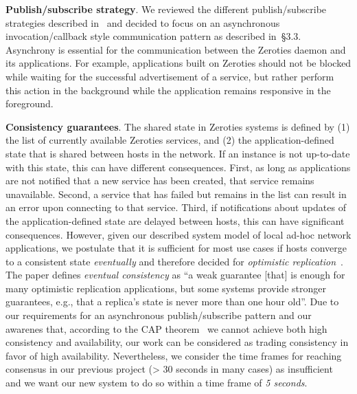 \textbf{Publish/subscribe strategy}. 
We reviewed the different publish/subscribe strategies described in~\cite{eugster_2003} and decided to focus on an asynchronous invocation/callback style communication pattern as described in~\cite{eugster_2003}§3.3. 
Asynchrony is essential for the communication between the Zeroties daemon and its applications.
For example, applications built on Zeroties should not be blocked while waiting for the successful advertisement of a service, but rather perform this action in the background while the application remains responsive in the foreground.

\textbf{Consistency guarantees}.
The shared state in Zeroties systems is defined by (1) the list of currently available Zeroties services, and (2) the application-defined state that is shared between hosts in the network.
If an instance is not up-to-date with this state, this can have different consequences. 
First, as long as applications are not notified that a new service has been created, that service remains unavailable.
Second, a service that has failed but remains in the list can result in an error upon connecting to that service. 
Third, if notifications about updates of the application-defined state are delayed between hosts, this can have significant consequences.
However, given our described system model of local ad-hoc network applications, we postulate that it is sufficient for most use cases if hosts converge to a consistent state \textit{eventually} and therefore decided for \textit{optimistic replication}~\cite{saito_2005}.
The paper defines \textit{eventual consistency} as ``a weak guarantee [that] is enough for many optimistic replication applications, but some systems provide stronger guarantees, e.g., that a replica's state is never more than one hour old''.
Due to our requirements for an asynchronous publish/subscribe pattern and our awarenes that, according to the CAP theorem~\cite{gilbert_2012} we cannot achieve both high consistency and availability, our work can be considered as trading consistency in favor of high availability.
Nevertheless, we consider the time frames for reaching consensus in our previous project (> 30 seconds in many cases) as insufficient and we want our new system to do so within a time frame of \textit{5 seconds}.

